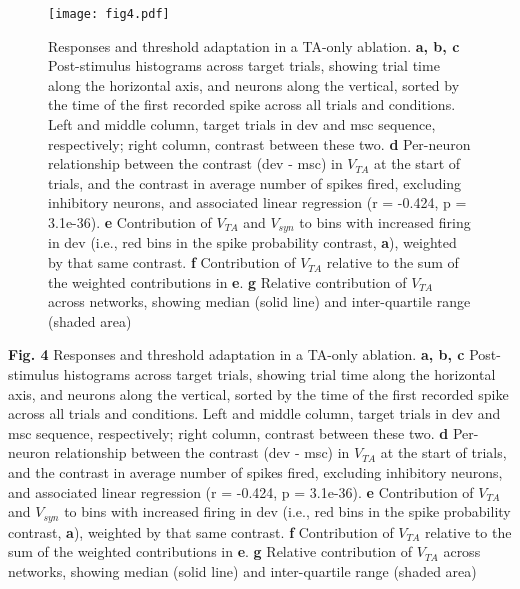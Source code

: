 \documentclass[pdflatex,referee,iicol,sn-basic]{sn-jnl}
\theoremstyle{thmstyleone}%
\theoremstyle{thmstyletwo}%
\theoremstyle{thmstylethree}%
\begin{document}
\begin{figure*}%
    \centering
    \texttt{[image: fig4.pdf]}
    \caption{Responses and threshold adaptation in a TA-only ablation. \textbf{a, b, c} Post-stimulus histograms across target trials, showing trial time along the horizontal axis, and neurons along the vertical, sorted by the time of the first recorded spike across all trials and conditions. Left and middle column, target trials in dev and msc sequence, respectively; right column, contrast between these two. \textbf{d} Per-neuron relationship between the contrast (dev - msc) in $V_{TA}$ at the start of trials, and the contrast in average number of spikes fired, excluding inhibitory neurons, and associated linear regression (r = -0.424, p = 3.1e-36). \textbf{e} Contribution of $V_{TA}$ and $V_{syn}$ to bins with increased firing in dev (i.e., red bins in the spike probability contrast, \textbf{a}), weighted by that same contrast. \textbf{f} Contribution of $V_{TA}$ relative to the sum of the weighted contributions in \textbf{e}. \textbf{g} Relative contribution of $V_{TA}$ across networks, showing median (solid line) and inter-quartile range (shaded area)}
    \label{fig4}
\end{figure*}

\textbf{Fig. 4} Responses and threshold adaptation in a TA-only ablation. \textbf{a, b, c} Post-stimulus histograms across target trials, showing trial time along the horizontal axis, and neurons along the vertical, sorted by the time of the first recorded spike across all trials and conditions. Left and middle column, target trials in dev and msc sequence, respectively; right column, contrast between these two. \textbf{d} Per-neuron relationship between the contrast (dev - msc) in $V_{TA}$ at the start of trials, and the contrast in average number of spikes fired, excluding inhibitory neurons, and associated linear regression (r = -0.424, p = 3.1e-36). \textbf{e} Contribution of $V_{TA}$ and $V_{syn}$ to bins with increased firing in dev (i.e., red bins in the spike probability contrast, \textbf{a}), weighted by that same contrast. \textbf{f} Contribution of $V_{TA}$ relative to the sum of the weighted contributions in \textbf{e}. \textbf{g} Relative contribution of $V_{TA}$ across networks, showing median (solid line) and inter-quartile range (shaded area)
\end{document}
